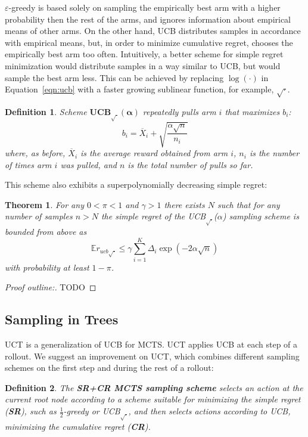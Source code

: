 \documentclass[letterpaper]{article}
\newcommand {\IE} {\ensuremath {\mathbb{E}}}
\newtheorem{dfn}{Definition}
\newtheorem{thm}{Theorem}
\begin{document}
$\varepsilon$-greedy is based solely on sampling the empirically best
arm with a higher probability then the rest of the arms, and ignores
information about empirical means of other arms. On the other hand,
UCB distributes samples in accordance with empirical means, but, in order to
minimize cumulative regret, chooses the empirically best arm too often.
Intuitively, a better scheme for simple regret minimization would
distribute samples in a way similar to UCB, but would sample the best arm
less. This can be achieved by replacing $\log(\cdot)$ in
Equation~\ref{eqn:ucb} with a faster growing sublinear function, for
example, $\sqrt\cdot$.
\begin{dfn} Scheme $\mathbf{UCB_{\sqrt{\cdot}}(\alpha)}$ repeatedly pulls arm $i$ that
maximizes $b_i$:
\begin{equation}
b_i=\overline X_i+\sqrt {\frac {\alpha \sqrt n} {n_i}}
\end{equation}
where, as before, $\overline X_i$ is the average reward obtained from arm $i$,
$n_i$ is the number of times arm $i$ was pulled, and $n$ is the total
number of pulls so far. \end{dfn}
This scheme also exhibits a superpolynomially decreasing simple regret:
\begin{thm}  For any $0<\pi<1$  and $\gamma>1$ there exists $N$ such that for
  any number of samples $n>N$ the simple regret of the  UCB$_{\sqrt{\cdot}}$($\alpha$)
sampling scheme is  bounded from above as
\begin{equation}
\IE r_{ucb\sqrt{\cdot}} \le \gamma\sum_{i=1}^K\Delta_i\exp\left(-2\alpha\sqrt{n}\right)
\end{equation}
with probability at least $1-\pi$.
\end{thm}

\begin{proof}[Proof outline:] TODO
\end{proof}

\subsection{Sampling in Trees}
\label{sec:sampling-in-trees}

UCT \cite{Kocsis.uct} is a generalization of UCB for MCTS.  UCT
applies UCB at each step of a rollout.  We suggest an improvement on
UCT, which combines different sampling schemes on the first step and
during the rest of a rollout:
\begin{dfn}
The \textbf{SR+CR MCTS sampling scheme} selects an action at the
current root node according to a scheme suitable for minimizing 
the simple regret (\textbf{SR}), such as $\frac 1 2$-greedy or UCB$_{\sqrt{\cdot}}$, and
then selects actions according to UCB, minimizing the cumulative regret (\textbf{CR}).
\end{dfn}
\end{document}
